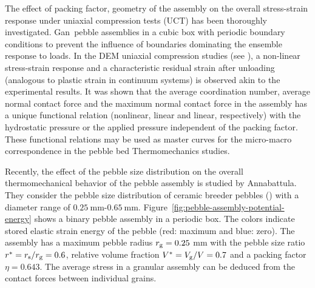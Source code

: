 The effect of packing factor, geometry of the assembly on the overall stress-strain response under uniaxial compression tests (UCT) has been thoroughly investigated.\cite{Gan:2010uq} Gan\etal~pebble assemblies in a cubic box with periodic boundary conditions to prevent the influence of boundaries dominating the ensemble response to loads.\cite{Gilabert2007} In the DEM uniaxial compression studies (see ), a non-linear stress-strain response and a characteristic residual strain after unloading (analogous to plastic strain in continuum systems) is observed akin to the experimental results.\cite{Reimann:2000tw} It was shown that the average coordination number, average normal contact force and the maximum normal contact force in the assembly has a unique functional relation (nonlinear, linear and linear, respectively) with the hydrostatic pressure or the applied pressure independent of the packing factor.\cite{Gan:2010uq,An20071393} These functional relations may be used as master curves for the micro-macro correspondence in the pebble bed Thermomechanics studies.

Recently, the effect of the pebble size distribution on the overall thermomechanical behavior of the pebble assembly is studied by Annabattula\etal\cite{Annabattula2011}. They consider the pebble size distribution of ceramic breeder pebbles (\lis) with a diameter range of $0.25\ \mathrm{mm}$-$0.65\ \mathrm{mm}$. Figure~\ref{fig:pebble-assembly-potential-energy} shows a binary pebble assembly in a periodic box. The colors indicate stored elastic strain energy of the pebble (red: maximum and blue: zero). The assembly has a maximum pebble radius $r_{\mathrm{g}}=0.25$ mm with the pebble size ratio $r^{*}=r_{\mathrm{s}}/r_{\mathrm{g}}=0.6$, relative volume fraction $V^{*}=V_{\mathrm{g}}/V=0.7$ and a packing factor $\eta=0.643$. The average stress in a granular assembly can be deduced from the contact forces between individual grains.


